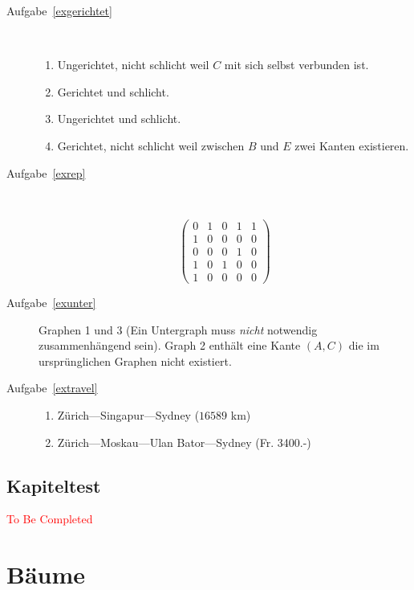 \documentclass[12pt,a4paper]{report}
\theoremstyle{break}
\theoremstyle{plain}
\newcommand{\algostep}[2]{\parbox{4cm}{\scalebox{0.5}{\texttt{[image: \#1]}}}
  \hfill
  \parbox{7cm}{#2}
}
\begin{document}
\begin{description}
\item[Aufgabe~\ref{exgerichtet}] \hfill \\[0cm]
\begin{enumerate}
\item Ungerichtet, nicht schlicht weil $C$
  mit sich selbst verbunden ist. 
\item Gerichtet und schlicht. 
\item Ungerichtet
  und schlicht. 
\item Gerichtet, nicht schlicht weil zwischen $B$ und $E$
  zwei Kanten existieren.
\end{enumerate}
\item[Aufgabe~\ref{exrep}] \hfill \\[0cm]
\algostep{Exrep.pdf}{
\begin{displaymath}
\left( 
\begin{array}{ccccc}
0 & 1 & 0 & 1 & 1 \\
1 & 0 & 0 & 0 & 0 \\
0 & 0 & 0 & 1 & 0 \\
1 & 0 & 1 & 0 & 0 \\
1 & 0 & 0 & 0 & 0 
\end{array}
\right)
\end{displaymath}}
\item[Aufgabe~\ref{exunter}] Graphen 1 und 3 (Ein Untergraph muss
  \emph{nicht} notwendig zusammenh\"{a}ngend sein). Graph 2
  enth\"{a}lt eine Kante $(A,C)$ die im urspr\"{u}nglichen Graphen
  nicht existiert. 
\item[Aufgabe~\ref{extravel}]\hfill\linebreak
\begin{enumerate}
\item Z\"{u}rich---Singapur---Sydney ($16589$ km)
\item Z\"{u}rich---Moskau---Ulan Bator---Sydney (Fr. 3400.-)
\end{enumerate}
\end{description}

\section{Kapiteltest}

\textcolor{red}{To Be Completed}

\chapter{B\"{a}ume}
\end{document}
